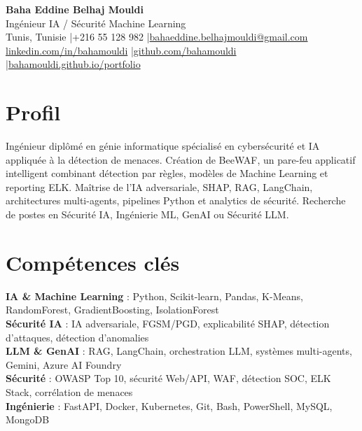 \documentclass[a4paper,10pt]{article}
\begin{document}
\begin{center}
{\LARGE\bfseries\color{navy} Baha Eddine Belhaj Mouldi}\\[4pt]
{\large Ingénieur IA / Sécurité Machine Learning}\\[6pt]
Tunis, Tunisie \quad|\quad +216 55 128 982 \quad|\quad \href{mailto:bahaeddine.belhajmouldi@gmail.com}{bahaeddine.belhajmouldi@gmail.com}\\[2pt]
\href{https://www.linkedin.com/in/bahamouldi}{linkedin.com/in/bahamouldi} \quad|\quad \href{https://github.com/bahamouldi}{github.com/bahamouldi} \quad|\quad \href{https://bahamouldi.github.io/portfolio/}{bahamouldi.github.io/portfolio}
\end{center}
\vspace{3pt}
\section{Profil}
Ingénieur diplômé en génie informatique spécialisé en cybersécurité et IA appliquée à la détection de menaces. Création de BeeWAF, un pare-feu applicatif intelligent combinant détection par règles, modèles de Machine Learning et reporting ELK. Maîtrise de l'IA adversariale, SHAP, RAG, LangChain, architectures multi-agents, pipelines Python et analytics de sécurité. Recherche de postes en Sécurité IA, Ingénierie ML, GenAI ou Sécurité LLM.
\section{Compétences clés}
\textbf{IA \& Machine Learning} : Python, Scikit-learn, Pandas, K-Means, RandomForest, GradientBoosting, IsolationForest\\[1pt]
\textbf{Sécurité IA} : IA adversariale, FGSM/PGD, explicabilité SHAP, détection d'attaques, détection d'anomalies\\[1pt]
\textbf{LLM \& GenAI} : RAG, LangChain, orchestration LLM, systèmes multi-agents, Gemini, Azure AI Foundry\\[1pt]
\textbf{Sécurité} : OWASP Top 10, sécurité Web/API, WAF, détection SOC, ELK Stack, corrélation de menaces\\[1pt]
\textbf{Ingénierie} : FastAPI, Docker, Kubernetes, Git, Bash, PowerShell, MySQL, MongoDB
\end{document}
